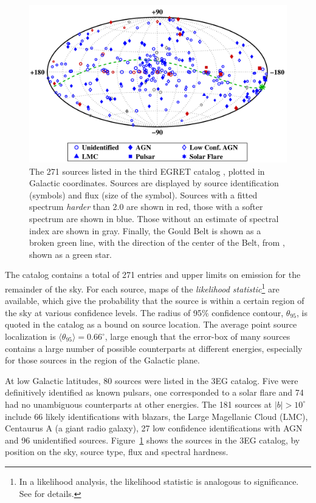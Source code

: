 \begin{figure}[t]
\includegraphics[angle=270,width=\textwidth]{plots/chap-introduction/3eg_catalog.pdf}
\caption{\label{FIG::INTRODUCTION::3RDEGRET} The 271 sources listed 
in the third EGRET catalog \citep{REF::HARTMAN::APJS1999}, plotted in
Galactic coordinates. Sources are displayed by source identification
(symbols) and flux (size of the symbol). Sources with a fitted
spectrum \textit{harder} than 2.0 are shown in red, those with a
softer spectrum are shown in blue. Those without an estimate of
spectral index are shown in gray. Finally, the Gould Belt is shown as
a broken green line, with the direction of the center of the Belt,
from \citet{REF::STOTHERS::AJ1974}, shown as a green star.}
\end{figure}

The catalog contains a total of 271 entries and upper limits on
emission for the remainder of the sky. For each source, maps of the
\textit{likelihood statistic}\footnote{In a likelihood analysis, the
likelihood statistic is analogous to significance. See
\citet{REF::MATTOX::APJ1996} for details.} are available, which give
the probability that the source is within a certain region of the sky at
various confidence levels.  The radius of 95\% confidence contour,
$\theta_{95}$, is quoted in the catalog as a bound on source
location. The average point source localization is
$\langle\theta_{95}\rangle=0.66^\circ$, large enough that the
error-box of many sources contains a large number of possible
counterparts at different energies, especially for those sources in
the region of the Galactic plane.

At low Galactic latitudes, 80 sources were listed in the 3EG
catalog. Five were definitively identified as known pulsars, one
corresponded to a solar flare and 74 had no unambiguous counterparts
at other energies. The 181 sources at $|b|>10^\circ$ include 66 likely
identifications with blazars, the Large Magellanic Cloud (LMC),
Centaurus A (a giant radio galaxy), 27 low confidence identifications
with AGN and 96 unidentified
sources. Figure~\ref{FIG::INTRODUCTION::3RDEGRET} shows the sources
in the 3EG catalog, by position on the sky, source type, flux
and spectral hardness.

